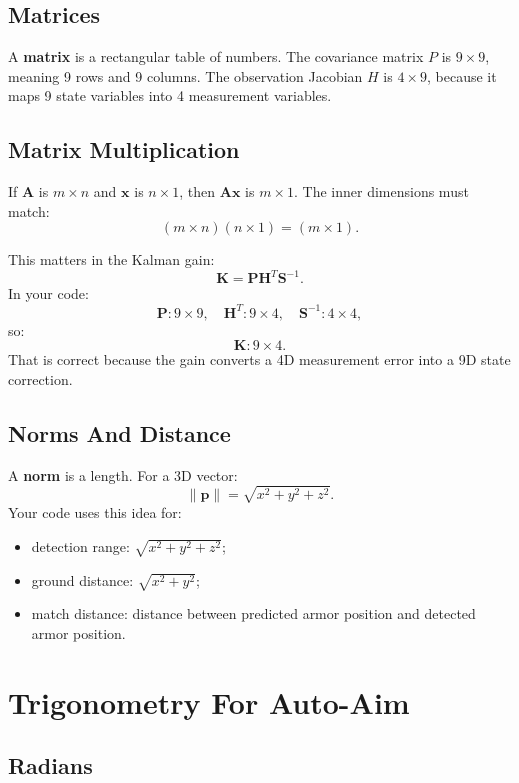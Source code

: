 \documentclass[11pt,a4paper]{article}
\newcommand{\vect}[1]{\bm{#1}}
\newcommand{\mat}[1]{\mathbf{#1}}
\begin{document}
\subsection{Matrices}

A \textbf{matrix} is a rectangular table of numbers.
The covariance matrix \(P\) is \(9\times 9\), meaning 9 rows and 9 columns.
The observation Jacobian \(H\) is \(4\times 9\), because it maps 9 state variables into 4 measurement variables.

\subsection{Matrix Multiplication}

If \(\mat{A}\) is \(m\times n\) and \(\vect{x}\) is \(n\times 1\), then \(\mat{A}\vect{x}\) is \(m\times 1\).
The inner dimensions must match:
\[
  (m\times n)(n\times 1) = (m\times 1).
\]

This matters in the Kalman gain:
\[
  \mat{K} = \mat{P}\mat{H}^{T}\mat{S}^{-1}.
\]
In your code:
\[
  \mat{P}:9\times 9,\quad
  \mat{H}^{T}:9\times 4,\quad
  \mat{S}^{-1}:4\times 4,
\]
so:
\[
  \mat{K}:9\times 4.
\]
That is correct because the gain converts a 4D measurement error into a 9D state correction.

\subsection{Norms And Distance}

A \textbf{norm} is a length.
For a 3D vector:
\[
  \|\vect{p}\| = \sqrt{x^2+y^2+z^2}.
\]
Your code uses this idea for:
\begin{itemize}[leftmargin=1.4em]
  \item detection range: \(\sqrt{x^2+y^2+z^2}\);
  \item ground distance: \(\sqrt{x^2+y^2}\);
  \item match distance: distance between predicted armor position and detected armor position.
\end{itemize}

\section{Trigonometry For Auto-Aim}

\subsection{Radians}
\end{document}
